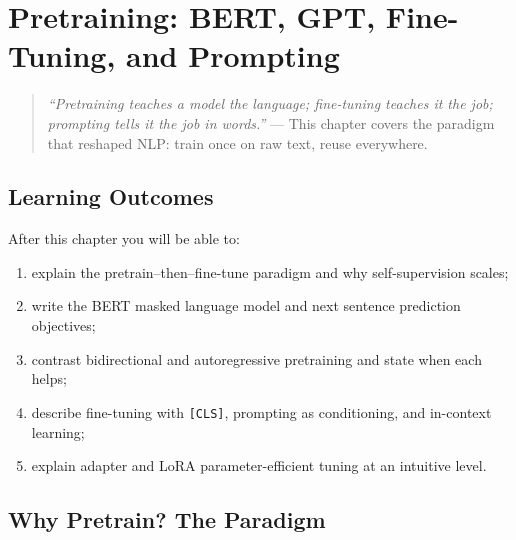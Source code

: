 \chapter{Pretraining: BERT, GPT, Fine-Tuning, and Prompting}
\label{ch:pretraining}

\begin{quote}
\emph{``Pretraining teaches a model the language; fine-tuning teaches it the job; prompting tells it the job in words.''} --- This chapter covers the paradigm that reshaped NLP: train once on raw text, reuse everywhere.
\end{quote}

\noindent{}
\vspace{0.4em}

\section*{Learning Outcomes}
After this chapter you will be able to:
\begin{enumerate}[label=(L\arabic*)]
    \item explain the pretrain--then--fine-tune paradigm and why self-supervision scales;
    \item write the BERT masked language model and next sentence prediction objectives;
    \item contrast bidirectional and autoregressive pretraining and state when each helps;
    \item describe fine-tuning with \texttt{[CLS]}, prompting as conditioning, and in-context learning;
    \item explain adapter and LoRA parameter-efficient tuning at an intuitive level.
\end{enumerate}

\section{Why Pretrain? The Paradigm}
\label{sec:pretrain-intuition}

